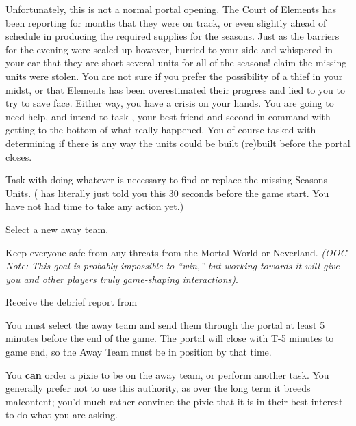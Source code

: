 \documentclass[char]{PP}
\begin{document}
Unfortunately, this is not a normal portal opening. The Court of Elements has been reporting for months that they were on track, or even slightly ahead of schedule in producing the required supplies for the seasons. Just as the barriers for the evening were sealed up however, \cEHead{} hurried to your side and whispered in your ear that they are short several units for all of the seasons! \cEHead{\They} claim\cEHead{\verbs} the missing units were stolen. You are not sure if you prefer the possibility of a thief in your midst, or that Elements has been overestimated their progress and lied to you to try to save face. Either way, you have a crisis on your hands. You are going to need help, and intend to task \cSAdvisor{}, your best friend and second in command with getting to the bottom of what really happened. You of course tasked \cEHead{} with determining if there is any way the units could be built (re)built before the portal closes.

\begin{itemz}
	\item Task \cSAdvisor{} with doing whatever is necessary to find or replace the missing Seasons Units. (\cEHead{} has literally just told you this 30 seconds before the game start. You have not had time to take any action yet.)
	\item Select a new away team.
	\item Keep everyone safe from any threats from the Mortal World or Neverland. \textit{(OOC Note: This goal is probably impossible to ``win,'' but working towards it will give you and other players truly game-shaping interactions)}.
	\item Receive the debrief report from \cSPM{}
\end{itemz}

\begin{itemz}[Notes]
	\item You must select the away team and send them through the portal at least 5 minutes before the end of the game. The portal will close with T-5 minutes to game end, so the Away Team must be in position by that time.
	\item You \textbf{can} order a pixie to be on the away team, or perform another task. You generally prefer not to use this authority, as over the long term it breeds malcontent; you'd much rather convince the pixie that it is in their best interest to do what you are asking.
\end{itemz}
\end{document}
